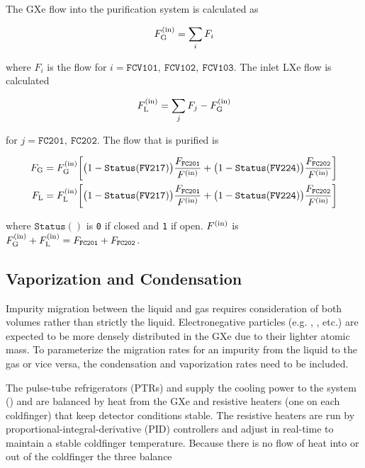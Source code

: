 The GXe flow into the purification system is calculated as

\begin{equation}
F_{\mathrm{G}}^{(\mathrm{in})} = \sum_i F_i
\end{equation}

\noindent where $F_i$ is the flow for $i = \mathtt{FCV101,\ FCV102,\ FCV103}$.  The inlet LXe flow is calculated

\begin{equation}
F_{\mathrm{L}}^{(\mathrm{in})} = \sum_j F_j - F_{\mathrm{G}}^{(\mathrm{in})}
\end{equation}

\noindent for $j = \mathtt{FC201,\ FC202}$.  The flow that is purified is

\begin{subequations}
\begin{align}
F_{\mathrm{G}} &= F_{\mathrm{G}}^{(\mathrm{in})} \bigg[ \big(1 - \mathtt{Status(FV217)}\big) \frac{F_{\mathtt{FC201}}}{F^{(\mathrm{in})}} +
\big(1 - \mathtt{Status(FV224)}\big) \frac{F_{\mathtt{FC202}}}{F^{(\mathrm{in})}} \bigg]
\\
F_{\mathrm{L}} &= F_{\mathrm{L}}^{(\mathrm{in})} \bigg[ \big(1 - \mathtt{Status(FV217)}\big) \frac{F_{\mathtt{FC201}}}{F^{(\mathrm{in})}} +
\big(1 - \mathtt{Status(FV224)}\big) \frac{F_{\mathtt{FC202}}}{F^{(\mathrm{in})}} \bigg]
\end{align}
\end{subequations}

\noindent where $\mathtt{Status()}$ is \texttt{0} if closed and \texttt{1} if open.  $F^{(\mathrm{in})}$ is
$F_{\mathrm{G}}^{(\mathrm{in})} + F_{\mathrm{L}}^{(\mathrm{in})} = F_{\mathtt{FC201}} + F_{\mathtt{FC202}}$.



\subsection{Vaporization and Condensation}
\label{subsec:electron_lifetime_model_vap_and_cond}
Impurity migration between the liquid and gas requires consideration of both volumes rather than strictly the liquid.  Electronegative
particles (e.g. , , etc.) are expected to be more densely distributed in the GXe due to their lighter atomic mass.  To
parameterize the migration rates for an impurity from the liquid to the gas or vice versa, the condensation and
vaporization rates need to be included.

The pulse-tube refrigerators (PTRs) and  supply the cooling power to the system () and are balanced
by heat from the GXe and resistive heaters (one on each coldfinger) that keep detector conditions stable.  The resistive heaters are run
by proportional-integral-derivative (PID) controllers and adjust in real-time to maintain a stable coldfinger temperature.  Because there
is no flow of heat into or out of the coldfinger the three balance

